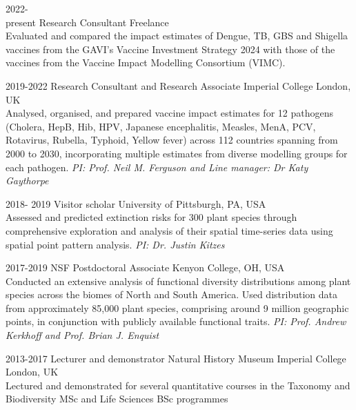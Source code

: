 \documentclass[icon]{twentysecondcv}
\begin{document}
\begin{twenty} %


 \twentyitem
    	{2022- \\ present}
    	{Research Consultant}
	{Freelance}
        	{\\ \small  Evaluated and compared the impact estimates of Dengue, TB, GBS and Shigella vaccines from the GAVI’s Vaccine Investment Strategy 2024 with those of the vaccines from the Vaccine Impact Modelling Consortium (VIMC).}
        	
	
 \twentyitem
       {2019-2022}
       {Research Consultant and Research Associate}
       {Imperial College London, UK}
       { \\ \small Analysed, organised, and prepared vaccine impact estimates for 12 pathogens (Cholera, HepB, Hib, HPV, Japanese encephalitis, Measles, MenA, PCV, Rotavirus, Rubella, Typhoid, Yellow fever) across 112 countries spanning from 2000 to 2030, incorporating multiple estimates from diverse modelling groups for each pathogen. \textit{ PI: Prof. Neil M. Ferguson and Line manager: Dr Katy Gaythorpe}}
      
\twentyitem
    	{2018- 2019}
	{Visitor scholar}
        	{University of Pittsburgh, PA, USA}
        	{\\ \small Assessed and predicted extinction risks for 300 plant species through comprehensive exploration and analysis of their spatial time-series data using spatial point pattern analysis. \textit{PI: Dr. Justin Kitzes}}

	\twentyitem
    	{2017-2019}
	{NSF Postdoctoral Associate}
        {Kenyon College, OH, USA}
        {\\  \small Conducted an extensive analysis of functional diversity distributions among plant species across the biomes of North and South America. Used distribution data from approximately 85,000 plant species, comprising around 9 million geographic points, in conjunction with publicly available functional traits. \textit{PI: Prof. Andrew Kerkhoff and Prof. Brian J. Enquist} }
      
    
    \twentyitem
	{2013-2017}
	{Lecturer and demonstrator}
	{Natural History Museum  Imperial College London, UK}
	{\\ \small Lectured and demonstrated for several quantitative courses in the Taxonomy and Biodiversity MSc and Life Sciences BSc programmes}
\end{twenty}
\end{document}
